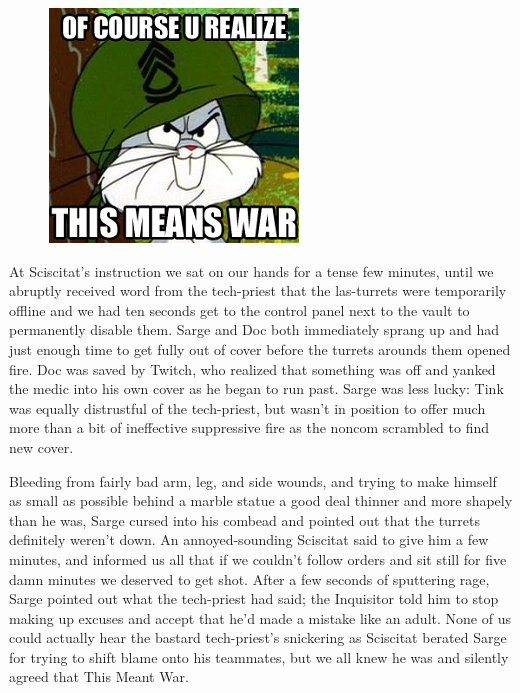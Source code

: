 \begin{figure}
	\begin{center}
		\includegraphics[width=\figwidth]{pics/18/64.png}
	\end{center}
\end{figure}
At Sciscitat's instruction we sat on our hands for a tense few minutes, until we abruptly received word from the tech-priest that the las-turrets were temporarily offline and we had ten seconds get to the control panel next to the vault to permanently disable them. 
Sarge and Doc both immediately sprang up and had just enough time to get fully out of cover before the turrets arounds them opened fire. 
Doc was saved by Twitch, who realized that something was off and yanked the medic into his own cover as he began to run past. 
 Sarge was less lucky: 
Tink was equally distrustful of the tech-priest, but wasn't in position to offer much more than a bit of ineffective suppressive fire as the noncom scrambled to find new cover. 


Bleeding from fairly bad arm, leg, and side wounds, and trying to make himself as small as possible behind a marble statue a good deal thinner and more shapely than he was, Sarge cursed into his combead and pointed out that the turrets definitely weren't down. 
An annoyed-sounding Sciscitat said to give him a few minutes, and informed us all that if we couldn't follow orders and sit still for five damn minutes we deserved to get shot. 
After a few seconds of sputtering rage, Sarge pointed out what the tech-priest had said; 
the Inquisitor told him to stop making up excuses and accept that he'd made a mistake like an adult. 
None of us could actually hear the bastard tech-priest's snickering as Sciscitat berated Sarge for trying to shift blame onto his teammates, but we all knew he was and silently agreed that This Meant War.

